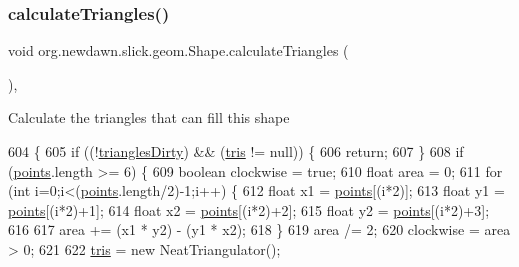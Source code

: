 \subsubsection{\texorpdfstring{calculate\+Triangles()}{calculateTriangles()}}
{\footnotesize\ttfamily void org.\+newdawn.\+slick.\+geom.\+Shape.\+calculate\+Triangles (\begin{DoxyParamCaption}{ }\end{DoxyParamCaption})\hspace{0.3cm}{\ttfamily [inline]}, {\ttfamily [protected]}}

Calculate the triangles that can fill this shape 
\begin{DoxyCode}
604                                         \{
605         \textcolor{keywordflow}{if} ((!\mbox{\hyperlink{classorg_1_1newdawn_1_1slick_1_1geom_1_1_shape_a9300b64ed3c260451f38151305e7c85e}{trianglesDirty}}) && (\mbox{\hyperlink{classorg_1_1newdawn_1_1slick_1_1geom_1_1_shape_abd907aa2c7a270db435ed15ce6d090da}{tris}} != null)) \{
606             \textcolor{keywordflow}{return};
607         \}
608         \textcolor{keywordflow}{if} (\mbox{\hyperlink{classorg_1_1newdawn_1_1slick_1_1geom_1_1_shape_a8b4d4058734bbb3b96072e470b92aa37}{points}}.length >= 6) \{
609             \textcolor{keywordtype}{boolean} clockwise = \textcolor{keyword}{true};
610             \textcolor{keywordtype}{float} area = 0;
611             \textcolor{keywordflow}{for} (\textcolor{keywordtype}{int} i=0;i<(\mbox{\hyperlink{classorg_1_1newdawn_1_1slick_1_1geom_1_1_shape_a8b4d4058734bbb3b96072e470b92aa37}{points}}.length/2)-1;i++) \{
612                 \textcolor{keywordtype}{float} x1 = \mbox{\hyperlink{classorg_1_1newdawn_1_1slick_1_1geom_1_1_shape_a8b4d4058734bbb3b96072e470b92aa37}{points}}[(i*2)];
613                 \textcolor{keywordtype}{float} y1 = \mbox{\hyperlink{classorg_1_1newdawn_1_1slick_1_1geom_1_1_shape_a8b4d4058734bbb3b96072e470b92aa37}{points}}[(i*2)+1];
614                 \textcolor{keywordtype}{float} x2 = \mbox{\hyperlink{classorg_1_1newdawn_1_1slick_1_1geom_1_1_shape_a8b4d4058734bbb3b96072e470b92aa37}{points}}[(i*2)+2];
615                 \textcolor{keywordtype}{float} y2 = \mbox{\hyperlink{classorg_1_1newdawn_1_1slick_1_1geom_1_1_shape_a8b4d4058734bbb3b96072e470b92aa37}{points}}[(i*2)+3];
616                 
617                 area += (x1 * y2) - (y1 * x2);
618             \}
619             area /= 2;
620             clockwise = area > 0;
621 
622             \mbox{\hyperlink{classorg_1_1newdawn_1_1slick_1_1geom_1_1_shape_abd907aa2c7a270db435ed15ce6d090da}{tris}} = \textcolor{keyword}{new} NeatTriangulator();

\end{DoxyCode}

